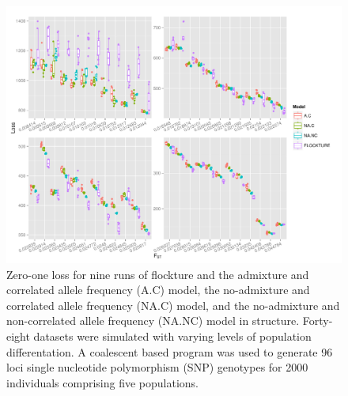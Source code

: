  \begin{figure}
\centering
  \includegraphics[width=.9\linewidth]{images/Figures-Pat/SNPloss.pdf}%
  \caption{Zero-one loss for nine runs of {\sc flockture} and the admixture and correlated allele 
  frequency (A.C) model, the no-admixture and correlated allele frequency (NA.C) model, 
and the no-admixture and non-correlated allele frequency (NA.NC) model in {\sc structure}. Forty-eight 
datasets were simulated with varying levels of population differentation. A coalescent based program
was used to generate 96 loci single nucleotide polymorphism (SNP) genotypes for 2000 
individuals comprising five populations.}
  \label{fig:SNPloss}
\end{figure} 


